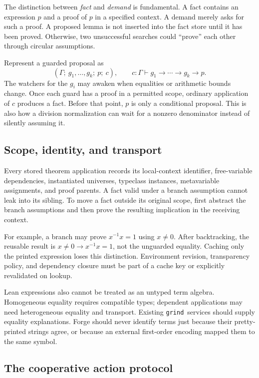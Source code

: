 \documentclass[11pt,a4paper]{article}
\newcommand{\grind}{\texttt{grind}}
\begin{document}
The distinction between \emph{fact} and \emph{demand} is fundamental. A fact
contains an expression $p$ and a proof of $p$ in a specified context. A demand
merely asks for such a proof. A proposed lemma is not inserted into the fact
store until it has been proved. Otherwise, two unsuccessful searches could
``prove'' each other through circular assumptions.

Represent a guarded proposal as
\[
 (\Gamma;\ g_1,\ldots,g_k;\ p;\ c),
 \qquad c:\Gamma\vdash g_1\to\cdots\to g_k\to p.
\]
The watchers for the $g_i$ may awaken when equalities or arithmetic bounds
change. Once each guard has a proof in a permitted scope, ordinary application
of $c$ produces a fact. Before that point, $p$ is only a conditional proposal.
This is also how a division normalization can wait for a nonzero denominator
instead of silently assuming it.

\subsection{Scope, identity, and transport}

Every stored theorem application records its local-context identifier,
free-variable dependencies, instantiated universes, typeclass instances,
metavariable assignments, and proof parents. A fact valid under a branch
assumption cannot leak into its sibling. To move a fact outside its original
scope, first abstract the branch assumptions and then prove the resulting
implication in the receiving context.

For example, a branch may prove $x^{-1}x=1$ using $x\ne0$. After backtracking,
the reusable result is $x\ne0\to x^{-1}x=1$, not the unguarded equality.
Caching only the printed expression loses this distinction. Environment
revision, transparency policy, and dependency closure must be part of a cache
key or explicitly revalidated on lookup.

Lean expressions also cannot be treated as an untyped term algebra.
Homogeneous equality requires compatible types; dependent applications may
need heterogeneous equality and transport. Existing \grind\ services should
supply equality explanations. Forge should never identify terms just because
their pretty-printed strings agree, or because an external first-order encoding
mapped them to the same symbol.

\subsection{The cooperative action protocol}
\end{document}
